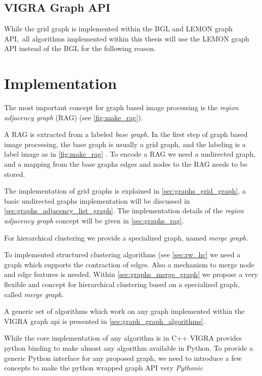 \subsection{VIGRA Graph API}

While the grid graph is implemented within the BGL and LEMON graph API,\
all algorithms implemented within this thesis will
use the LEMON graph API instead of the BGL 
for the following reason.





\section{Implementation}\label{sec:vigra_graph_lib_impl}

The most important concept for graph based image processing
is the \emph{region adjacency graph} (RAG) (see \cref{fig:make_rag}).

A RAG is extracted from a labeled \emph{base graph}.
In the first step of graph based image processing, the base 
graph is usually a grid graph, and the labeling is a label image
as in \cref{fig:make_rag} .
To encode a RAG we need a undirected graph, 
and a mapping from the base graphs edges and nodes to the RAG 
needs to be stored.

The implementation of grid graphs is explained in \cref{sec:graphs_grid_graph}, 
a basic undirected graphs implementation will be discussed in \cref{sec:graphs_adjacency_list_graph}.
The implementation details of the \emph{region adjacency graph} concept will 
be given in  \cref{sec:graphs_rag}.

For hierarchical clustering we provide a specialized graph, named \emph{merge graph}.


To implemented structured clustering algorithms (see \cref{sec:rw_hc} we
need a graph which supports the contraction of edges.
Also a mechanism to merge node and edge features is needed.
Within \cref{sec:graphs_merge_graph} we propose  a very flexible
and concept for hierarchical clustering based on a specialized graph,
called \emph{merge graph}.


A generic set of algorithms which work on any graph
implemented within the VIGRA graph api is presented 
in \cref{sec:graph_graph_algorithms}.

While the core implementation of any algorithm is in C++
VIGRA provides python binding to make almost
any algorithm available in Python.
To provide a generic Python interface for any proposed
graph, we need to introduce a few concepts 
to make the python wrapped graph API very \emph{Pythonic}


